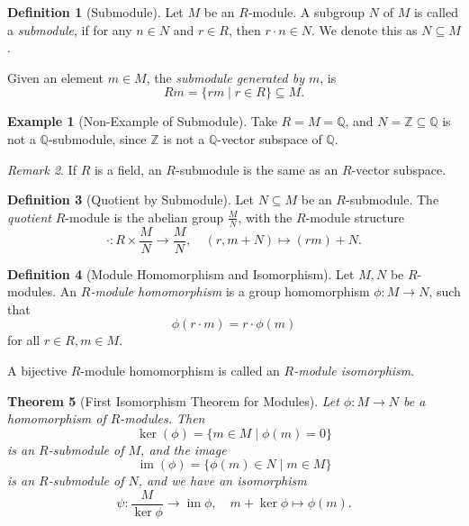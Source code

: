 \documentclass{article}
\newtheorem{theorem}{Theorem}[section]
\theoremstyle{definition}
\newtheorem{definition}[theorem]{Definition}
\newtheorem*{example*}{Example}
\theoremstyle{remark}
\newtheorem{remark}[theorem]{Remark}
\newcommand{\pqty}[1]{\left(#1\right)}
\newcommand{\set}[2]{\{#1\mid #2\}}
\newcommand{\flatfrac}[2]{\frac{#1}{#2}}
\newcommand{\functiondomain}[3]{#1:#2\to #3}
\newcommand{\function}[5]{#1:#2\to #3,\quad #4\mapsto #5}
\newcommand{\submodule}{\subseteq}
\newcommand{\ZZ}{\mathbb{Z}}
\newcommand{\QQ}{\mathbb{Q}}
\newcommand{\img}{\operatorname{im}}
\begin{document}
\begin{definition}[Submodule]
    \label{def:submodule}%
    Let \(M\) be an \(R\)-module. A subgroup \(N\) of \(M\) is called a \emph{submodule}, if for any \(n \in N\) and \(r \in R\), then \(r \cdot n \in N\). We denote this as \(N \submodule M\).

    Given an element \(m \in M\), the \emph{submodule generated by \(m\)}, is
    \[
        Rm = \set{rm}{r \in R} \submodule M.
    \]
\end{definition}

\begin{example*}[Non-Example of Submodule]
    Take \(R = M = \QQ\), and \(N = \ZZ \subseteq \QQ\) is not a \(\QQ\)-submodule, since \(\ZZ\) is not a \(\QQ\)-vector subspace of \(\QQ\).
\end{example*}

\begin{remark}
    If \(R\) is a field, an \(R\)-submodule is the same as an \(R\)-vector subspace.
\end{remark}

\begin{definition}[Quotient by Submodule]
    \label{def:quotient-submodule}%
    Let \(N \submodule M\) be an \(R\)-submodule. The \emph{quotient} \(R\)-module is the abelian group \(\flatfrac{M}{N}\), with the \(R\)-module structure
    \[
        \function{\cdot}{R \times \flatfrac{M}{N}}{\flatfrac{M}{N}}{\pqty{r, m + N}}{\pqty{rm} + N.}
    \] 
\end{definition}

\begin{definition}[Module Homomorphism and Isomorphism]
    \label{def:homomorphism-isomorphism-module}%
    Let \(M, N\) be \(R\)-modules. An \emph{\(R\)-module homomorphism} is a group homomorphism \(\functiondomain{\phi}{M}{N}\), such that
    \[
        \phi \pqty{r \cdot m} = r \cdot \phi\pqty{m}
    \]
    for all \(r \in R, m \in M\).

    A bijective \(R\)-module homomorphism is called an \emph{\(R\)-module isomorphism}.
\end{definition}

\begin{theorem}[First Isomorphism Theorem for Modules]
    \label{thm:first-isomorphism-theorem-modules}%
    Let \(\functiondomain{\phi}{M}{N}\) be a homomorphism of \(R\)-modules. Then
    \[
        \ker\pqty{\phi} = \set{m \in M}{\phi\pqty{m} = 0}
    \]
    is an \(R\)-submodule of \(M\), and the image
    \[
        \img\pqty{\phi} = \set{\phi\pqty{m} \in N}{m \in M}
    \]
    is an \(R\)-submodule of \(N\), and we have an isomorphism
    \[
        \function{\psi}{\flatfrac{M}{\ker \phi}}{\img \phi}{m + \ker \phi}{\phi\pqty{m}.}
    \]
\end{theorem}
\end{document}
